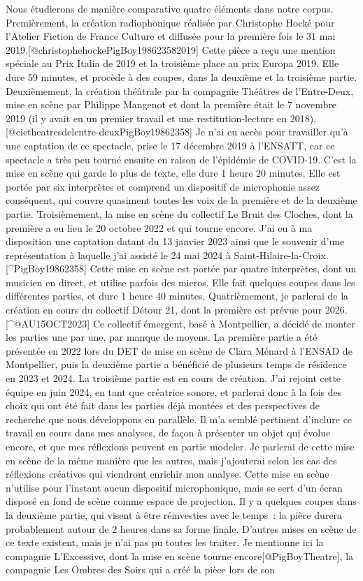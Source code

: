 \documentclass[
]{article}
\begin{document}
Nous étudierons de manière comparative quatre éléments dans notre corpus. Premièrement, la création radiophonique réalisée par Christophe Hocké pour l'Atelier Fiction de France Culture et diffusée pour la première fois le 31 mai 2019.{[}@christophehockePigBoy198623582019{]} Cette pièce a reçu une mention spéciale au Prix Italia de 2019 et la troisième place au prix Europa 2019. Elle dure 59 minutes, et procède à des coupes, dans la deuxième et la troisième partie. Deuxièmement, la création théâtrale par la compagnie Théâtres de l'Entre-Deux, mise en scène par Philippe Mangenot et dont la première était le 7 novembre 2019 (il y avait eu un premier travail et une restitution-lecture en 2018).{[}@cietheatresdelentre-deuxPigBoy19862358{]} Je n'ai eu accès pour travailler qu'à une captation de ce spectacle, prise le 17 décembre 2019 à l'ENSATT, car ce spectacle a très peu tourné ensuite en raison de l'épidémie de COVID-19. C'est la mise en scène qui garde le plus de texte, elle dure 1 heure 20 minutes. Elle est portée par six interprètes et comprend un dispositif de microphonie assez conséquent, qui couvre quasiment toutes les voix de la première et de la deuxième partie. Troisièmement, la mise en scène du collectif Le Bruit des Cloches, dont la première a eu lieu le 20 octobre 2022 et qui tourne encore. J'ai eu à ma disposition une captation datant du 13 janvier 2023 ainsi que le souvenir d'une représentation à laquelle j'ai assisté le 24 mai 2024 à Saint-Hilaire-la-Croix.{[}\^{}PigBoy19862358{]} Cette mise en scène est portée par quatre interprètes, dont un musicien en direct, et utilise parfois des micros. Elle fait quelques coupes dans les différentes parties, et dure 1 heure 40 minutes. Quatrièmement, je parlerai de la création en cours du collectif Détour 21, dont la première est prévue pour 2026.{[}\^{}@AU15OCT2023{]} Ce collectif émergent, basé à Montpellier, a décidé de monter les parties une par une, par manque de moyens. La première partie a été présentée en 2022 lors du DET de mise en scène de Clara Ménard à l'ENSAD de Montpellier, puis la deuxième partie a bénéficié de plusieurs temps de résidence en 2023 et 2024. La troisième partie est en cours de création. J'ai rejoint cette équipe en juin 2024, en tant que créatrice sonore, et parlerai donc à la fois des choix qui ont été fait dans les parties déjà montées et des perspectives de recherche que nous développons en parallèle. Il m'a semblé pertinent d'inclure ce travail en cours dans mes analyses, de façon à présenter un objet qui évolue encore, et que mes réflexions peuvent en partie modeler. Je parlerai de cette mise en scène de la même manière que les autres, mais j'ajouterai selon les cas des réflexions créatives qui viendront enrichir mon analyse. Cette mise en scène n'utilise pour l'instant aucun dispositif microphonique, mais se sert d'un écran disposé en fond de scène comme espace de projection. Il y a quelques coupes dans la deuxième partie, qui visent à être réinvesties avec le temps~: la pièce durera probablement autour de 2 heures dans sa forme finale. D'autres mises en scène de ce texte existent, mais je n'ai pas pu toutes les traiter. Je mentionne ici la compagnie L'Excessive, dont la mise en scène tourne encore{[}@PigBoyTheatre{]}, la compagnie Les Ombres des Soirs qui a créé la pièce lors de son 
\end{document}
